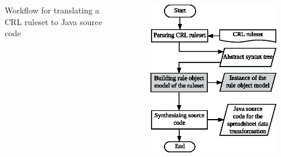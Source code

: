 \documentclass{beamer}
\begin{document}
\begin{frame}
\begin{columns}[t]
\small Workflow for translating a CRL ruleset to Java source code
\begin{figure}
\includegraphics[width=0.95\linewidth]{crl2j_wf_part2}
\end{figure}
\end{columns}
\end{frame}
\end{document}
